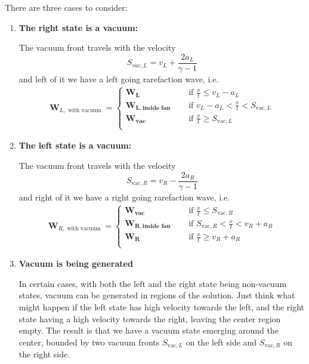 There are three cases to consider:


\begin{enumerate}

\item \textbf{The right state is a vacuum:}

	The vacuum front travels with the velocity
	\begin{equation}
		S_{vac, L} = v_L + \frac{2 a_L}{\gamma - 1}
	\end{equation}
	and left of it we have a left going rarefaction wave, i.e.
	\begin{align}
		\mathbf{W}_{L, \text{ with vacuum }} =
			\begin{cases}
			\mathbf{W_L} &
				\quad \text{ if } \frac{x}{t} \leq v_L - a_L \\
			\mathbf{W_{L, \text{inside fan}}} &
				\quad \text{ if }
					v_L - a_L < \frac{x}{t} < S_{\mathrm{vac}, L} \\
			\mathbf{W_{vac}} &
				\quad \text{ if } \frac{x}{t} \geq S_{\mathrm{vac}, L}\\
			\end{cases}
	\end{align}

\item \textbf{The left state is a vacuum:}
	
		The vacuum front travels with the velocity
		\begin{equation}
			S_{\mathrm{vac}, R} = v_R - \frac{2 a_R}{\gamma - 1}
		\end{equation}
		and right of it we have a right going rarefaction wave, i.e.
		\begin{align}
		\mathbf{W}_{R, \text{ with vacuum }} =
			\begin{cases}
			\mathbf{W_{vac}} &
				\quad \text{ if } \frac{x}{t} \leq S_{\mathrm{vac}, R}\\
			\mathbf{W_{R, \text{inside fan}}} &
				\quad \text{ if }
					S_{\mathrm{vac}, R} < \frac{x}{t} < v_R + a_R\\
			\mathbf{W_R} &
				\quad \text{ if } \frac{x}{t} \geq v_R + a_R \\
			\end{cases}
		\end{align}
		
	\item \textbf{ Vacuum is being generated }
	
		In certain cases, with both the left and the right state being
		non-vacuum states, vacuum can be generated in regions of the solution.
		Just think what might happen if the left state has high velocity
		towards the left, and the right state having a high velocity towards
		the right, leaving the center region empty. The result is that we have a
		vacuum state emerging around the center, bounded by two vacuum fronts
		$S_{\mathrm{vac}, L}$ on the left side and $S_{\mathrm{vac}, R}$ on the
		right side.


\end{enumerate}
